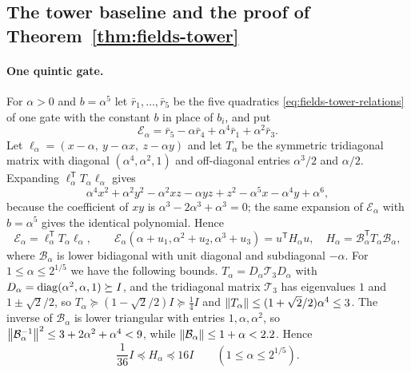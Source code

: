 \subsection{The tower baseline and the proof of Theorem~\ref{thm:fields-tower}}
\label{app:fields-tower}

\paragraph{One quintic gate.}
For $\alpha>0$ and $b=\alpha^5$ let $\bar r_1,\ldots,\bar r_5$ be the five
quadratics \eqref{eq:fields-tower-relations} of one gate with the constant
$b$ in place of $b_i$, and put
\[
 \mathcal E_\alpha=\bar r_5-\alpha\bar r_4+\alpha^4\bar r_1+\alpha^2\bar r_3 .
\]
Let $\ell_\alpha=(x-\alpha,\ y-\alpha x,\ z-\alpha y)$ and let $T_\alpha$ be the
symmetric tridiagonal matrix with diagonal $(\alpha^4,\alpha^2,1)$ and
off-diagonal entries $\alpha^3/2$ and $\alpha/2$. Expanding
$\ell_\alpha^{\mathsf T}T_\alpha\ell_\alpha$ gives
\[
 \alpha^4x^2+\alpha^2y^2-\alpha^2xz-\alpha yz+z^2-\alpha^5x-\alpha^4y+\alpha^6,
\]
because the coefficient of $xy$ is $\alpha^3-2\alpha^3+\alpha^3=0$; the same
expansion of $\mathcal E_\alpha$ with $b=\alpha^5$ gives the identical
polynomial. Hence
\begin{equation}
 \mathcal E_\alpha=\ell_\alpha^{\mathsf T}T_\alpha\ell_\alpha,\qquad
 \mathcal E_\alpha(\alpha+u_1,\alpha^2+u_2,\alpha^3+u_3)=u^{\mathsf T}H_\alpha u,
 \quad H_\alpha=\mathcal B_\alpha^{\mathsf T}T_\alpha\mathcal B_\alpha,
 \label{eq:fields-gate-exposing}
\end{equation}
where $\mathcal B_\alpha$ is lower bidiagonal with unit diagonal and
subdiagonal $-\alpha$. For $1\le\alpha\le2^{1/5}$ we have the following
bounds. $T_\alpha=D_\alpha\mathcal T_3D_\alpha$ with
$D_\alpha=\operatorname{diag}(\alpha^2,\alpha,1)\succeq I$, and the tridiagonal matrix
$\mathcal T_3$ has eigenvalues $1$ and $1\pm\sqrt2/2$, so
$T_\alpha\succeq(1-\sqrt2/2)I\succeq\frac14I$ and
$\left\lVert T_\alpha\right\rVert\le(1+\sqrt2/2)\alpha^4\le3$. The inverse of
$\mathcal B_\alpha$ is lower triangular with entries $1,\alpha,\alpha^2$,
so $\left\lVert\mathcal B_\alpha^{-1}\right\rVert^2\le3+2\alpha^2+\alpha^4<9$, while
$\left\lVert\mathcal B_\alpha\right\rVert\le1+\alpha<2.2$. Hence
\begin{equation}
 \frac1{36}I\preceq H_\alpha\preceq16I\qquad(1\le\alpha\le2^{1/5}).
 \label{eq:fields-gate-bounds}
\end{equation}

